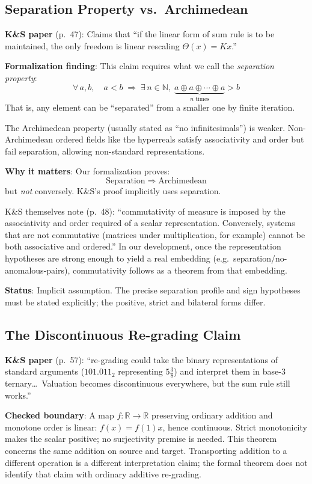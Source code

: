 \documentclass[11pt]{article}
\begin{document}
\subsection{Separation Property vs.\ Archimedean}

\textbf{K\&S paper} (p.~47): Claims that ``if the linear form of sum rule is to be
maintained, the only freedom is linear rescaling $\Theta(x) = Kx$.''

\textbf{Formalization finding}: This claim requires what we call the \emph{separation property}:
\[
\forall\, a, b,\quad a < b \;\Longrightarrow\; \exists\, n \in \mathbb{N},\;
\underbrace{a \oplus a \oplus \cdots \oplus a}_{n \text{ times}} > b
\]
That is, any element can be ``separated'' from a smaller one by finite iteration.

The Archimedean property (usually stated as ``no infinitesimals'') is weaker.
Non-Archimedean ordered fields like the hyperreals satisfy associativity and order
but fail separation, allowing non-standard representations.

\textbf{Why it matters}: Our formalization proves:
\[
\text{Separation} \;\Longrightarrow\; \text{Archimedean}
\]
but \emph{not} conversely. K\&S's proof implicitly uses separation.

K\&S themselves note (p.~48): ``commutativity of measure is imposed by the associativity
and order required of a scalar representation. Conversely, systems that are not
commutative (matrices under multiplication, for example) cannot be both associative
and ordered.'' In our development, once the representation hypotheses are strong enough to yield
a real embedding (e.g.\ separation/no-anomalous-pairs), commutativity follows as a theorem from that
embedding.

\textbf{Status}: Implicit assumption. The precise separation profile and sign hypotheses
must be stated explicitly; the positive, strict and bilateral forms differ.

\subsection{The Discontinuous Re-grading Claim}

\textbf{K\&S paper} (p.~57): ``re-grading could take the binary representations of
standard arguments ($101.011_2$ representing $5\frac{3}{8}$) and interpret them in
base-3 ternary\ldots\ Valuation becomes discontinuous everywhere, but the sum rule
still works.''

\textbf{Checked boundary}: A map $f:\mathbb{R}\to\mathbb{R}$ preserving
ordinary addition and monotone order is linear: $f(x)=f(1)x$, hence continuous.
Strict monotonicity makes the scalar positive; no surjectivity premise is needed.
This theorem concerns the same addition on source and target. Transporting
addition to a different operation is a different interpretation claim; the
formal theorem does not identify that claim with ordinary additive re-grading.
\end{document}
